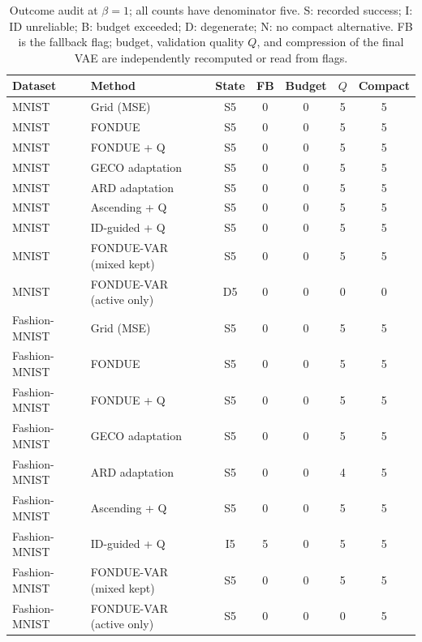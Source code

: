 \begin{table}[H]
\caption{Outcome audit at $\beta=1$; all counts have denominator five. S: recorded success; I: ID unreliable; B: budget exceeded; D: degenerate; N: no compact alternative. FB is the fallback flag; budget, validation quality $Q$, and compression of the final VAE are independently recomputed or read from flags.}\label{tab:outcomes0}
\footnotesize
\setlength{\tabcolsep}{3.5pt}
\begin{tabular*}{\textwidth}{@{\extracolsep{\fill}}llccccc@{}}
\toprule
Dataset & Method & State & FB & Budget & $Q$ & Compact \\
\midrule
MNIST & Grid (MSE) & S5 & 0 & 0 & 5 & 5 \\
MNIST & FONDUE & S5 & 0 & 0 & 5 & 5 \\
MNIST & FONDUE + Q & S5 & 0 & 0 & 5 & 5 \\
MNIST & GECO adaptation & S5 & 0 & 0 & 5 & 5 \\
MNIST & ARD adaptation & S5 & 0 & 0 & 5 & 5 \\
MNIST & Ascending + Q & S5 & 0 & 0 & 5 & 5 \\
MNIST & ID-guided + Q & S5 & 0 & 0 & 5 & 5 \\
MNIST & FONDUE-VAR (mixed kept) & S5 & 0 & 0 & 5 & 5 \\
MNIST & FONDUE-VAR (active only) & D5 & 0 & 0 & 0 & 0 \\
Fashion-MNIST & Grid (MSE) & S5 & 0 & 0 & 5 & 5 \\
Fashion-MNIST & FONDUE & S5 & 0 & 0 & 5 & 5 \\
Fashion-MNIST & FONDUE + Q & S5 & 0 & 0 & 5 & 5 \\
Fashion-MNIST & GECO adaptation & S5 & 0 & 0 & 5 & 5 \\
Fashion-MNIST & ARD adaptation & S5 & 0 & 0 & 4 & 5 \\
Fashion-MNIST & Ascending + Q & S5 & 0 & 0 & 5 & 5 \\
Fashion-MNIST & ID-guided + Q & I5 & 5 & 0 & 5 & 5 \\
Fashion-MNIST & FONDUE-VAR (mixed kept) & S5 & 0 & 0 & 5 & 5 \\
Fashion-MNIST & FONDUE-VAR (active only) & S5 & 0 & 0 & 0 & 5 \\
\bottomrule
\end{tabular*}
\end{table}
